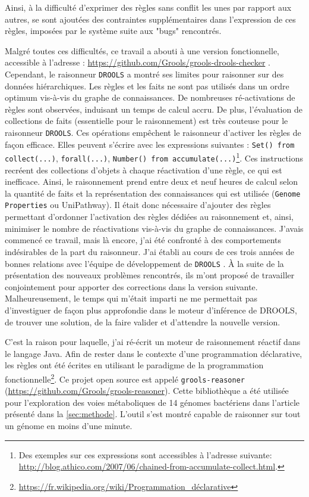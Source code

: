 \begin{refsegment}
Ainsi, à la difficulté d'exprimer des règles sans conflit les unes par rapport aux autres, se sont ajoutées des contraintes supplémentaires dans l’expression de ces règles, imposées par le système suite aux "bugs" rencontrés.

Malgré toutes ces difficultés, ce travail a abouti à une version fonctionnelle, accessible à l'adresse : \url{https://github.com/Grools/grools-drools-checker} . Cependant, le raisonneur \texttt{DROOLS} a montré ses limites pour raisonner sur des données hiérarchiques. Les règles et les faits ne sont pas utilisés dans un ordre optimum vis-à-vis du graphe de connaissances. De nombreuses ré-activations de règles sont observées, induisant un temps de calcul accru. De plus, l'évaluation de collections de faits (essentielle pour le raisonnement) est très couteuse pour le raisonneur \texttt{DROOLS}. Ces opérations empêchent le raisonneur d'activer les règles de façon efficace. Elles peuvent s'écrire avec les expressions suivantes : \lstinline[style=drl-style]$Set() from collect(...)$, \lstinline[style=drl-style]$forall(...)$, \lstinline[style=drl-style]$Number() from accumulate(...)$\footnote{Des exemples sur ces expressions sont accessibles à l'adresse suivante: \url{http://blog.athico.com/2007/06/chained-from-accumulate-collect.html}.}. Ces instructions recréent des collections d'objets à chaque réactivation d'une règle, ce qui est inefficace. Ainsi, le raisonnement prend entre deux et neuf heures de calcul selon la quantité de faits et la représentation des connaissances qui est utilisée (\texttt{Genome Properties} ou UniPathway). Il était donc nécessaire d'ajouter des règles permettant d'ordonner l'activation des règles dédiées au raisonnement et, ainsi, minimiser le nombre de réactivations vis-à-vis du graphe de connaissances. J'avais commencé ce travail, mais là encore, j'ai été confronté à des comportements indésirables de la part du raisonneur. J'ai établi au cours de ces trois années de bonnes relations avec l'équipe de développement de \texttt{DROOLS} . À la suite de la présentation  des nouveaux problèmes rencontrés, ils m'ont proposé de travailler conjointement pour apporter des corrections dans la version suivante. Malheureusement, le temps qui m'était imparti ne me permettait pas d'investiguer de façon plus approfondie dans le moteur d'inférence de DROOLS, de trouver une solution, de la faire valider et d'attendre la nouvelle version.

C'est la raison pour laquelle, j'ai ré-écrit un moteur de raisonnement réactif dans le langage Java. Afin de rester dans le contexte d'une programmation déclarative, les règles ont été écrites en utilisant le paradigme de la programmation fonctionnelle\footnote{\url{https://fr.wikipedia.org/wiki/Programmation_déclarative}}. Ce projet open source est appelé \texttt{grools-reasoner} (\url{https://github.com/Grools/grools-reasoner}). Cette bibliothèque a été utilisée pour l'exploration des voies métaboliques de 14 génomes bactériens dans l'article présenté dans la  \cref{sec:methode}. L'outil s'est montré capable de raisonner sur tout un génome en moins d'une minute.


\end{refsegment}
